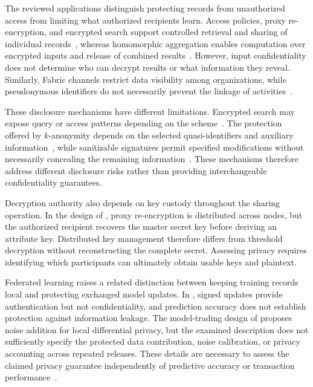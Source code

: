 \label{sec:privacy-evaluation}

The reviewed applications distinguish protecting records from unauthorized access from limiting what authorized recipients learn. Access policies, proxy re-encryption, and encrypted search support controlled retrieval and sharing of individual records~\cite{2021-system-medical-data-privacy,2018-towards-secure}, whereas homomorphic aggregation enables computation over encrypted inputs and release of combined results~\cite{2021-priv-iot-homo}. However, input confidentiality does not determine who can decrypt results or what information they reveal. Similarly, Fabric channels restrict data visibility among organizations, while pseudonymous identifiers do not necessarily prevent the linkage of activities~\cite{2020-privy-sharing,2017-provchain}.


These disclosure mechanisms have different limitations. Encrypted search may expose query or access patterns depending on the scheme~\cite{2018-towards-secure,10.1109/jiot.2023.3287636}. The protection offered by $k$-anonymity depends on the selected quasi-identifiers and auxiliary information~\cite{2021-medical-data-sharing}, while sanitizable signatures permit specified modifications without necessarily concealing the remaining information~\cite{10.1109/tifs.2023.3297327}. These mechanisms therefore address different disclosure risks rather than providing interchangeable confidentiality guarantees.

Decryption authority also depends on key custody throughout the sharing operation. In the design of \citet{updateRen2024DistributedKMS}, proxy re-encryption is distributed across nodes, but the authorized recipient recovers the master secret key before deriving an attribute key. Distributed key management therefore differs from threshold decryption without reconstructing the complete secret. Assessing privacy requires identifying which participants can ultimately obtain usable keys and plaintext.

Federated learning raises a related distinction between keeping training records local and protecting exchanged model updates. In \citet{updateGupta2024LungFL}, signed updates provide authentication but not confidentiality, and prediction accuracy does not establish protection against information leakage. The model-trading design of \citet{updateHussain2025ZeroTrust} proposes noise addition for local differential privacy, but the examined description does not sufficiently specify the protected data contribution, noise calibration, or privacy accounting across repeated releases. These details are necessary to assess the claimed privacy guarantee independently of predictive accuracy or transaction performance~\cite{context-dwork-roth2014}.

